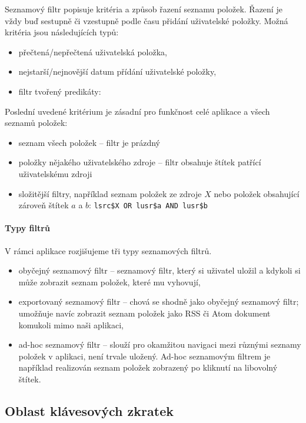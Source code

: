 Seznamový filtr popisuje kritéria a způsob řazení seznamu položek.
Řazení je vždy buď sestupně či vzestupně podle času přidání uživatelské položky.
Možná kritéria jsou následujících typů:
\begin{itemize}
	\item přečtená/nepřečtená uživatelská položka,
	\item nejstarší/nejnovější datum přídání uživatelské položky,
	\item filtr tvořený predikáty: 
\end{itemize}

Poslední uvedené kritérium je zásadní pro funkčnost celé aplikace a všech seznamů položek:
\begin{itemize}
	\item seznam všech položek -- filtr je prázdný
	\item položky nějakého uživatelského zdroje -- filtr obsahuje štítek patřící uživatelskému zdroji
	\item složitější filtry, například seznam položek ze zdroje $X$ nebo položek obsahující zároveň štítek $a$ a $b$:
		\verb|lsrc$X OR lusr$a AND lusr$b|
\end{itemize}

\paragraph{Typy filtrů}
V rámci aplikace rozjišujeme tři typy seznamových filtrů.
\begin{itemize}
	\item obyčejný seznamový filtr -- seznamový filtr, který si uživatel uložil a kdykoli si může zobrazit seznam položek, které mu vyhovují,
	\item exportovaný seznamový filtr -- chová se shodně jako obyčejný seznamový filtr; umožňuje navíc zobrazit seznam položek jako RSS či Atom dokument komukoli mimo naši aplikaci,
	\item ad-hoc seznamový filtr -- slouží pro okamžitou navigaci mezi různými seznamy položek v aplikaci, není trvale uložený.
		Ad-hoc seznamovým filtrem je například realizován seznam položek zobrazený po kliknutí na libovolný štítek.
\end{itemize}

\subsection{Oblast klávesových zkratek}

